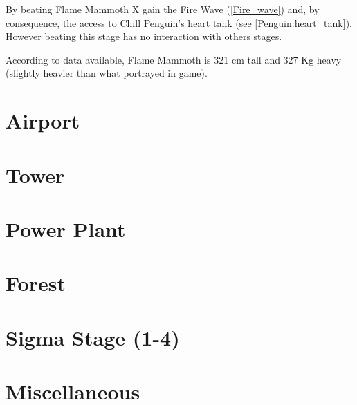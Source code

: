 By beating Flame Mammoth X gain the Fire Wave (\ref{Fire_wave}) and, by consequence, the access to Chill Penguin's heart tank (see \ref{Penguin:heart_tank}). However beating this stage has no interaction with others stages.

According to data available, Flame Mammoth is 321 cm tall and 327 Kg heavy (slightly heavier than what portrayed in game).
\section{Airport}
\section{Tower}
\section{Power Plant}
\section{Forest}
\section{Sigma Stage (1-4)}
\section{Miscellaneous}\label{X1:misc} %
